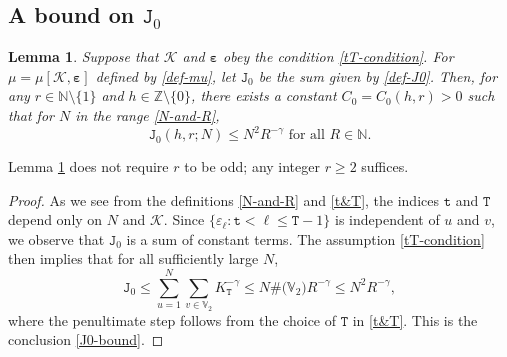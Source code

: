 \documentclass[12pt, twoside]{article}
\newtheorem{lemma}[theorem]{Lemma}
\theoremstyle{definition}
\numberwithin{equation}{section}
\begin{document}
\subsection{A bound on $\mathtt J_0$} 
\begin{lemma} \label{J0-lemma}
Suppose that $\mathcal K$ and $\pmb{\varepsilon}$ obey the condition \eqref{tT-condition}. For $\mu = \mu[\mathcal K, \pmb{\varepsilon}]$  defined by \eqref{def-mu}, let $\mathtt J_0$ be the sum given by \eqref{def-J0}. Then, for any $r \in \mathbb N \setminus \{1\}$ and $h \in \mathbb Z \setminus \{0\}$, there exists a constant $C_0 = C_0(h, r) > 0$ such that for 
 $N$ in the range \eqref{N-and-R}, 
\begin{equation} \label{J0-bound}
\mathtt J_0(h, r; N) \leq N^2 R^{-\gamma} \text{ for all } R \in \mathbb N. 
\end{equation} 
\end{lemma}
 Lemma \ref{J0-lemma} does not require $r$ to be odd; any integer $r \geq 2$ suffices. 
\begin{proof} 
As we see from the definitions \eqref{N-and-R} and \eqref{t&T}, the indices $\mathtt t$ and $\mathtt T$ depend only on $N$ and $\mathcal K$. Since $\{\varepsilon_{\ell} : \mathtt t < \ell \leq \mathtt T-1 \}$ is independent of $u$ and $v$, we observe that $\mathtt J_0$ is a sum of constant terms. The assumption \eqref{tT-condition} then implies that for all sufficiently large $N$, 
\[\mathtt J_0 \leq \sum_{u=1}^{N} \sum_{v \in \mathbb V_2} K_{\mathtt T}^{-\gamma} \leq N \# \bigl(\mathbb V_2 \bigr) R^{-\gamma} \leq N^2 R^{-\gamma}, \] 
where the penultimate step follows from the choice of $\mathtt T$ in \eqref{t&T}. This is the conclusion \eqref{J0-bound}. 
\end{proof} 
\end{document}
